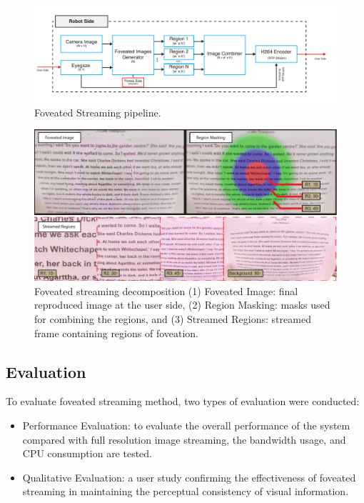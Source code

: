 \begin{figure} [t!]
\includegraphics[width=1\linewidth]{figures/system/fov-system.pdf}
\centering
  \captionsetup{justification=centering}
\caption{Foveated Streaming pipeline.}
\label{fig.system}
\end{figure}


\begin{figure} [t!]
\includegraphics[width=1\linewidth]{figures/system/FoveationLevels.pdf}
\centering
  \captionsetup{justification=centering}
\caption{Foveated streaming decomposition (1) Foveated Image: final reproduced image at the user side, (2) Region Masking: masks used for combining the regions, and (3) Streamed Regions: streamed frame containing regions of foveation.}
\label{fig.levels}
\end{figure}


\subsection{Evaluation}
To evaluate foveated streaming method, two types of evaluation were conducted:
\begin{itemize}
\item Performance Evaluation: to evaluate the overall performance of the system compared with full resolution image streaming, the bandwidth usage, and CPU consumption are tested.
\item Qualitative Evaluation: a user study confirming the effectiveness of foveated streaming in maintaining the perceptual consistency of visual information.
\end{itemize}

